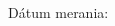 \makeatletter
\begin{titlepage}
	\begin{center}
		
		\vspace*{100pt}
		
		\begin{spacing}{2.5}
			{\Huge\textbf{\@title}}	
		\end{spacing}	

	\end{center}

	\vfill

	Dátum merania: \measureDate
	\hfill
	\@author
\end{titlepage}
